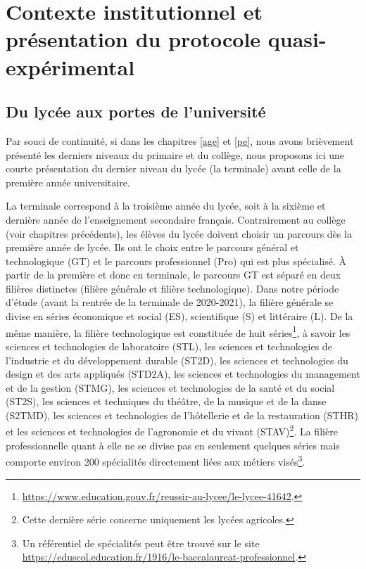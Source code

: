 \documentclass[
]{book}
\begin{document}
\hypertarget{g20inst}{%
\section{Contexte institutionnel et présentation du protocole quasi-expérimental}\label{g20inst}}

\hypertarget{g20instuniv}{%
\subsection{Du lycée aux portes de l'université}\label{g20instuniv}}

Par souci de continuité, si dans les chapitres \ref{age} et \ref{pe}, nous avons brièvement présenté les derniers niveaux du primaire et du collège, nous proposons ici une courte présentation du dernier niveau du lycée (la terminale) avant celle de la première année universitaire.

\quad La terminale correspond à la troisième année du lycée, soit à la sixième et dernière année de l'enseignement secondaire français. Contrairement au collège (voir chapitres précédents), les élèves du lycée doivent choisir un parcours dès la première année de lycée. Ils ont le choix entre le parcours général et technologique (GT) et le parcours professionnel (Pro) qui est plus spécialisé. À partir de la première et donc en terminale, le parcours GT est séparé en deux filières distinctes (filière générale et filière technologique). Dans notre période d'étude (avant la rentrée de la terminale de 2020-2021), la filière générale se divise en séries économique et social (ES), scientifique (S) et littéraire (L). De la même manière, la filière technologique est constituée de huit séries\footnote{\url{https://www.education.gouv.fr/reussir-au-lycee/le-lycee-41642}.}, à savoir les sciences et technologies de laboratoire (STL), les sciences et technologies de l'industrie et du développement durable (ST2D), les sciences et technologies du design et des arts appliqués (STD2A), les sciences et technologies du management et de la gestion (STMG), les sciences et technologies de la santé et du social (ST2S), les sciences et techniques du théâtre, de la musique et de la danse (S2TMD), les sciences et technologies de l'hôtellerie et de la restauration (STHR) et les sciences et technologies de l'agronomie et du vivant (STAV)\footnote{Cette dernière série concerne uniquement les lycées agricoles.}. La filière professionnelle quant à elle ne se divise pas en seulement quelques séries mais comporte environ 200 spécialités directement liées aux métiers visés\footnote{Un référentiel de spécialités peut être trouvé sur le site \url{https://eduscol.education.fr/1916/le-baccalaureat-professionnel}.}.
\end{document}
